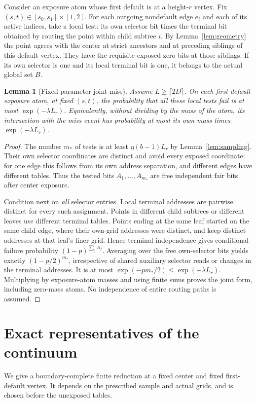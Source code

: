 \documentclass[11pt]{article}
\newtheorem{lemma}[theorem]{Lemma}
\theoremstyle{definition}
\theoremstyle{remark}
\begin{document}
Consider an exposure atom whose first default is at a height-$r$ vertex.
Fix $(s,t)\in[s_0,s_1]\times[1,2]$. For each outgoing nondefault edge $e_i$
and each of its active indices, take a local test: its own selector bit times
the terminal bit obtained by routing the point within child subtree $i$.
By Lemma~\ref{lem:geometry} the point agrees with the center at strict ancestors
and at preceding siblings of this default vertex. They have the requisite
exposed zero bits at those siblings. If its own selector is one and its local
terminal bit is one, it belongs to the actual global set $B$.

\begin{lemma}[Fixed-parameter joint miss]\label{lem:joint}
Assume $L\geq\lceil2D\rceil$. On each first-default exposure atom, at fixed
$(s,t)$, the probability that all these local tests fail is at most
$\exp(-\lambda L_r)$. Equivalently, without dividing by the mass of the atom,
its intersection with the miss event has probability at most its own mass
times $\exp(-\lambda L_r)$.
\end{lemma}
\begin{proof}
The number $m_*$ of tests is at least $\eta(b-1)L_r$ by
Lemma~\ref{lem:sampling}. Their own selector coordinates are distinct and avoid
every exposed coordinate: for one edge this follows from its own address
separation, and different edges have different tables. Thus the tested bits
$A_1,\ldots,A_{m_*}$ are free independent fair bits after center exposure.

Condition next on \emph{all} selector entries. Local terminal addresses are
pairwise distinct for every such assignment. Points in different child
subtrees or different leaves use different terminal tables. Points ending at
the same leaf started on the same child edge, where their own-grid addresses
were distinct, and keep distinct addresses at that leaf's finer grid. Hence
terminal independence gives conditional failure probability
$(1-p)^{\sum_j A_j}$. Averaging over the free own-selector bits yields exactly
$(1-p/2)^{m_*}$, irrespective of shared auxiliary selector reads or changes in
the terminal addresses. It is at most
$\exp(-pm_*/2)\leq\exp(-\lambda L_r)$.
Multiplying by exposure-atom masses and using finite sums proves the joint
form, including zero-mass atoms. No independence of entire routing paths is
assumed.
\end{proof}

\section{Exact representatives of the continuum}\label{sec:representatives}
We give a boundary-complete finite reduction at a fixed center and fixed
first-default vertex. It depends on the prescribed sample and actual grids,
and is chosen before the unexposed tables.
\end{document}

